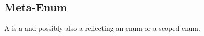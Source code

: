 \subsection{Meta-Enum}
\label{concept-Meta-Enum}

A  is a  and possibly also a 
reflecting an enum or a scoped enum.



